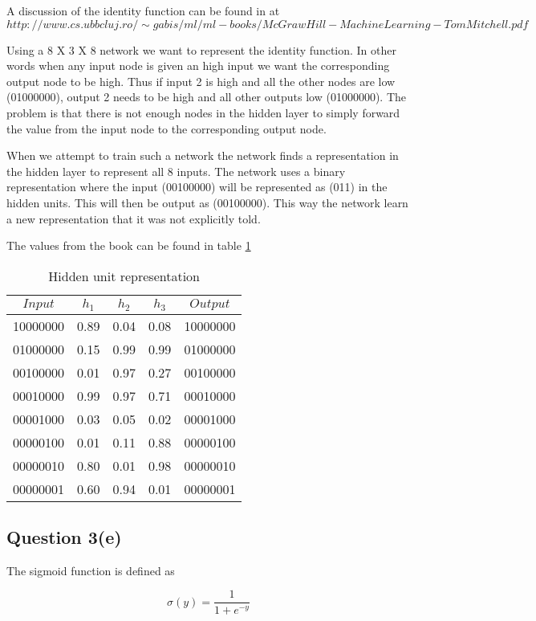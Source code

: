 \documentclass[10pt,a4paper]{article}
\begin{document}
A discussion of the identity function can be found in \citep[p106]{Michell2009} at $http://www.cs.ubbcluj.ro/\sim gabis/ml/ml-books/McGrawHill - Machine Learning -Tom Mitchell.pdf$

Using a 8 X 3 X 8 network we want to represent the identity function. In other words when any input node is given an high input we want the corresponding output node to be high. Thus if input 2 is high and all the other nodes are low (01000000), output 2 needs to be high and all other outputs low (01000000).  The problem is that there is not enough nodes in the hidden layer to simply forward the value from the input node to the corresponding output node. 

When we attempt to train such a network the network finds a representation in the hidden layer to represent all 8 inputs. The network uses a binary representation where the input (00100000) will be represented as (011) in the hidden units. This will then be output as (00100000). This way the network learn a new representation that it was not explicitly told.

The values from the book can be found in table \ref{table2}

\begin{table}
\begin{tabular}{|c|c|c|c|c||}
\hline
$Input$ & $h_1$ & $h_2$ & $h_3$ & $Output$ \\
\hline
10000000 & 0.89 & 0.04 & 0.08 & 10000000 \\
01000000 & 0.15 & 0.99 & 0.99 & 01000000 \\
00100000 & 0.01 & 0.97 & 0.27 & 00100000 \\
00010000 & 0.99 & 0.97 & 0.71 & 00010000 \\
00001000 & 0.03 & 0.05 & 0.02 & 00001000 \\
00000100 & 0.01 & 0.11 & 0.88 & 00000100 \\
00000010 & 0.80 & 0.01 & 0.98 & 00000010 \\
00000001 & 0.60 & 0.94 & 0.01 & 00000001 \\
\hline
\end{tabular}
\caption{Hidden unit representation}\label{table2}
\end{table}

\subsection{Question 3(e)}

The sigmoid function is defined as

\begin{equation}
\sigma(y) = \frac{1}{1+e^{-y}}
\end{equation}


\end{document}
